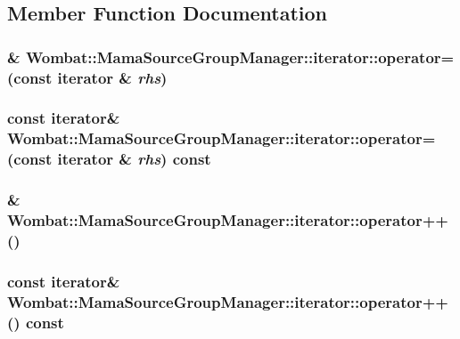 \subsection{Member Function Documentation}
\hypertarget{classWombat_1_1MamaSourceGroupManager_1_1iterator_a77ae5fb73ee15a5f0814ab36224fcbe2}{
\subsubsection[{operator=}]{\& Wombat::MamaSourceGroupManager::iterator::operator= (const {\bf iterator} \& {\em rhs})}}
\label{classWombat_1_1MamaSourceGroupManager_1_1iterator_a77ae5fb73ee15a5f0814ab36224fcbe2}
\hypertarget{classWombat_1_1MamaSourceGroupManager_1_1iterator_acba3ef0bc77f99226c19bf4405e62601}{
\subsubsection[{operator=}]{\setlength{\rightskip}{0pt plus 5cm}const {\bf iterator}\& Wombat::MamaSourceGroupManager::iterator::operator= (const {\bf iterator} \& {\em rhs}) const}}
\label{classWombat_1_1MamaSourceGroupManager_1_1iterator_acba3ef0bc77f99226c19bf4405e62601}
\hypertarget{classWombat_1_1MamaSourceGroupManager_1_1iterator_ab98446bbffd2ac1e92cf9299af6c94f2}{
\subsubsection[{operator++}]{\& Wombat::MamaSourceGroupManager::iterator::operator++ ()}}
\label{classWombat_1_1MamaSourceGroupManager_1_1iterator_ab98446bbffd2ac1e92cf9299af6c94f2}
\hypertarget{classWombat_1_1MamaSourceGroupManager_1_1iterator_a57a5e622aff341cea9b58803b45f841a}{
\subsubsection[{operator++}]{\setlength{\rightskip}{0pt plus 5cm}const {\bf iterator}\& Wombat::MamaSourceGroupManager::iterator::operator++ () const}}
